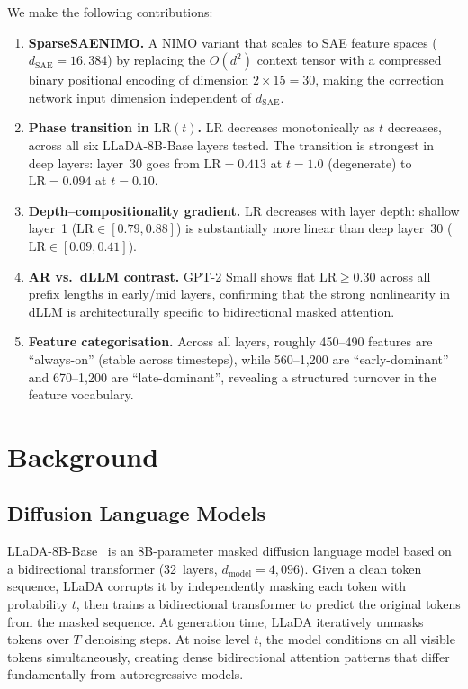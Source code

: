 \documentclass[11pt]{article}
\newcommand{\LR}{\mathrm{LR}}
\begin{document}
We make the following contributions:
\begin{enumerate}[leftmargin=*]
    \item \textbf{SparseSAENIMO.} A NIMO variant that scales to SAE feature spaces ($d_\mathrm{SAE} = 16{,}384$) by replacing the $O(d^2)$ context tensor with a compressed binary positional encoding of dimension $2 \times 15 = 30$, making the correction network input dimension independent of $d_\mathrm{SAE}$.

    \item \textbf{Phase transition in $\LR(t)$.} LR decreases monotonically as $t$ decreases, across all six LLaDA-8B-Base layers tested. The transition is strongest in deep layers: layer~30 goes from $\LR = 0.413$ at $t = 1.0$ (degenerate) to $\LR = 0.094$ at $t = 0.10$.

    \item \textbf{Depth--compositionality gradient.} LR decreases with layer depth: shallow layer~1 ($\LR \in [0.79, 0.88]$) is substantially more linear than deep layer~30 ($\LR \in [0.09, 0.41]$).

    \item \textbf{AR vs.\ dLLM contrast.} GPT-2 Small shows flat $\LR \ge 0.30$ across all prefix lengths in early/mid layers, confirming that the strong nonlinearity in dLLM is architecturally specific to bidirectional masked attention.

    \item \textbf{Feature categorisation.} Across all layers, roughly 450--490 features are ``always-on'' (stable across timesteps), while 560--1,200 are ``early-dominant'' and 670--1,200 are ``late-dominant'', revealing a structured turnover in the feature vocabulary.
\end{enumerate}

\section{Background}

\subsection{Diffusion Language Models}

LLaDA-8B-Base~\citep{llada2024} is an 8B-parameter masked diffusion language model based on a bidirectional transformer (32~layers, $d_\mathrm{model} = 4{,}096$).
Given a clean token sequence, LLaDA corrupts it by independently masking each token with probability $t$, then trains a bidirectional transformer to predict the original tokens from the masked sequence.
At generation time, LLaDA iteratively unmasks tokens over $T$ denoising steps.
At noise level $t$, the model conditions on all visible tokens simultaneously, creating dense bidirectional attention patterns that differ fundamentally from autoregressive models.
\end{document}
